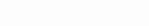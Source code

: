 \documentclass[french]{STIC_poster}
\begin{document}
\begin{frame}[t]
\begin{columns}[t]
\begin{column}{.48\linewidth}
\begin{abox}{\textbf{\textcolor{white}{Problem statement}}}
\begin{itemize}
\begin{itemize}
                                    \end{itemize}
                                  \end{itemize}


\end{abox}
\end{column}
\end{columns}
\end{frame}
\end{document}
